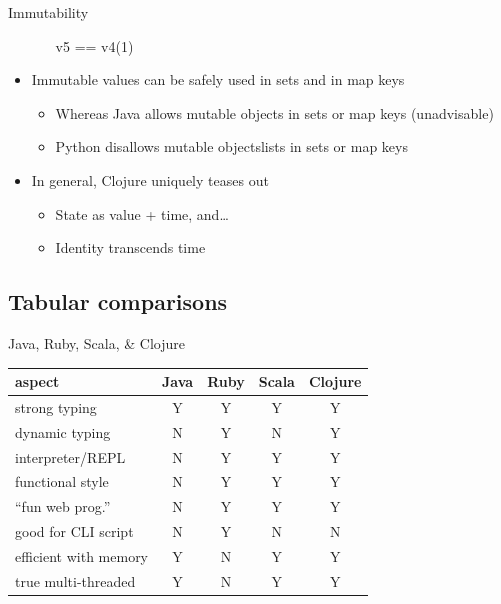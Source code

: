 \documentclass{beamer}
\begin{document}
\begin{frame}[allowframebreaks]{Immutability}
\begin{itemize}
\begin{itemize}
{\ttfamily\color{black}
v5 == v4(1)}

    \end{itemize}
  \item Immutable values can be safely used in sets and in map keys
    \begin{itemize}
    \item Whereas Java allows mutable objects in sets or map keys (unadvisable)
    \item Python disallows mutable objectslists in sets or map keys
    \end{itemize}
  \item In general, Clojure uniquely teases out
    \begin{itemize}
    \item State as value + time, and\ldots
    \item Identity transcends time
    \end{itemize}
  \end{itemize}
\end{frame}

\subsection{Tabular comparisons}

\begin{frame}{Java, Ruby, Scala, \& Clojure}
  \begin{tabular}{l || c | c | c | c}
    aspect & Java & Ruby & Scala & Clojure\\
    \hline
    \hline
    strong typing & Y & Y & Y & Y\\
    \hline
    dynamic typing & N & Y & N & Y\\
    \hline
    interpreter/REPL & N & Y & Y & Y\\
    \hline
    functional style & N & Y & Y & Y\\
    \hline
    ``fun web prog.'' & N & Y & Y & Y\\
    \hline
    good for CLI script & N & Y & N & N\\
    \hline
    efficient with memory & Y & N & Y & Y\\
    \hline
    true multi-threaded & Y & N & Y & Y\\
  \end{tabular}
\end{frame}
\end{document}

